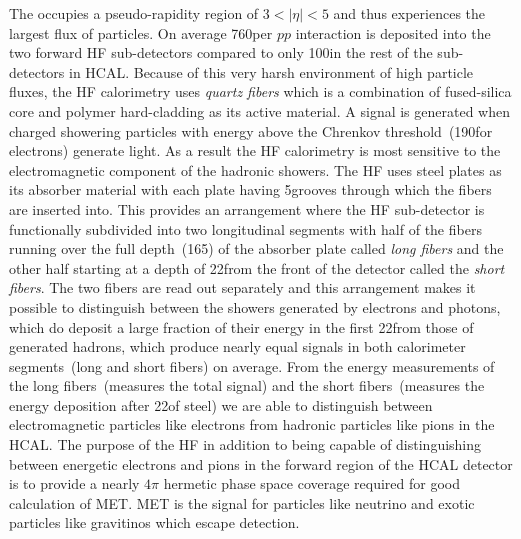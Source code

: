 \newline
The  occupies a pseudo-rapidity region of $3 < \vert \eta \vert < 5$ and thus experiences the largest flux of particles. On average 760\GeV per $pp$  interaction is deposited into the two forward HF sub-detectors compared to only 100\GeV in the rest of the sub-detectors in HCAL. Because of this very harsh environment of high particle fluxes, the HF calorimetry uses \textit{quartz fibers} which is a combination of fused-silica core and polymer hard-cladding as its active material. A signal is generated when charged  showering particles with energy above the Chrenkov threshold~(190\keV for electrons) generate light. As a result the HF calorimetry is most sensitive to the electromagnetic component of the hadronic showers. The HF uses steel plates as its absorber material with each plate having 5\mm grooves through which the fibers are inserted into. This provides an arrangement where the HF sub-detector is functionally subdivided into two longitudinal segments with half of the fibers running over the full depth~(165\cm) of the absorber plate called \textit{long fibers} and the other half starting at a depth of 22\cm from the front of the detector called the \textit{short fibers}. The two fibers are read out separately and this arrangement makes it possible to distinguish between the showers generated by electrons and photons, which do deposit a large fraction of their energy in the first 22\cm from those of generated hadrons, which produce nearly equal signals in both calorimeter segments~(long and short fibers) on average. From the energy measurements of the long fibers~(measures the total signal) and the short fibers~(measures the energy deposition after 22\cm of steel) we are able to distinguish between electromagnetic particles like electrons from hadronic particles like pions in the HCAL.
\newline
The purpose of the HF in addition to being capable of distinguishing between energetic electrons and pions in the forward region of the HCAL detector is to provide a nearly $4\pi$ hermetic phase space coverage required for good calculation of MET. MET is the signal for particles like neutrino and exotic particles like gravitinos which escape detection.

